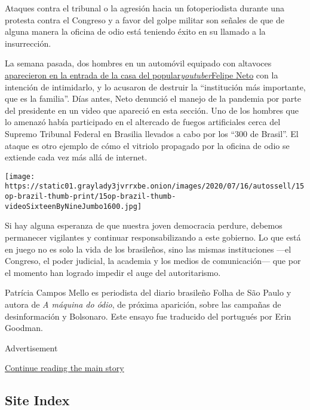 Ataques contra el tribunal o la agresión hacia un fotoperiodista durante
una protesta contra el Congreso y a favor del golpe militar son señales
de que de alguna manera la oficina de odio está teniendo éxito en su
llamado a la insurrección.

La semana pasada, dos hombres en un automóvil equipado con altavoces
\href{https://esportes.yahoo.com/noticias/aliados-jair-bolsonaro-atacam-casa-felipe-neto-010129218.html}{aparecieron
en la entrada de la casa del
popular}\href{https://esportes.yahoo.com/noticias/aliados-jair-bolsonaro-atacam-casa-felipe-neto-010129218.html}{\emph{youtuber}}\href{https://esportes.yahoo.com/noticias/aliados-jair-bolsonaro-atacam-casa-felipe-neto-010129218.html}{Felipe
Neto} con la intención de intimidarlo, y lo acusaron de destruir la
``institución más importante, que es la familia''. Días antes, Neto
denunció el manejo de la pandemia por parte del presidente en un video
que apareció en esta sección. Uno de los hombres que lo amenazó había
participado en el altercado de fuegos artificiales cerca del Supremo
Tribunal Federal en Brasilia llevados a cabo por los ``300 de Brasil''.
El ataque es otro ejemplo de cómo el vitriolo propagado por la oficina
de odio se extiende cada vez más allá de internet.

\texttt{[image: https://static01.graylady3jvrrxbe.onion/images/2020/07/16/autossell/15op-brazil-thumb-print/15op-brazil-thumb-videoSixteenByNineJumbo1600.jpg]}

Si hay alguna esperanza de que nuestra joven democracia perdure, debemos
permanecer vigilantes y continuar responsabilizando a este gobierno. Lo
que está en juego no es solo la vida de los brasileños, sino las mismas
instituciones ---el Congreso, el poder judicial, la academia y los
medios de comunicación--- que por el momento han logrado impedir el auge
del autoritarismo.

Patrícia Campos Mello es periodista del diario brasileño Folha de São
Paulo y autora de \emph{A máquina do ódio}, de próxima aparición, sobre
las campañas de desinformación y Bolsonaro. Este ensayo fue traducido
del portugués por Erin Goodman.

Advertisement

\protect\hyperlink{after-bottom}{Continue reading the main story}

\hypertarget{site-index}{%
\subsection{Site Index}\label{site-index}}


